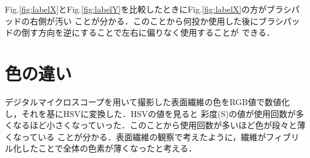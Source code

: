 \documentclass[main]{subfiles}
\begin{document}
Fig.\ref{fig:labelX}とFig.\ref{fig:labelY}を比較したときにFig.\ref{fig:labelX}の方がブラシパッドの右側が汚い
ことが分かる．このことから何投か使用した後にブラシパッドの倒す方向を逆にすることで左右に偏りなく使用することが
できる．
\\

\section{色の違い}
デジタルマイクロスコープを用いて撮影した表面繊維の色をRGB値で数値化し，それを基にHSVに変換した．HSVの値を見ると
彩度(S)の値が使用回数が多くなるほど小さくなっていった．このことから使用回数が多いほど色が段々と薄くなっている
ことが分かる．表面繊維の観察で考えたように，繊維がフィブリル化したことで全体の色素が薄くなったと考える．
\end{document}
